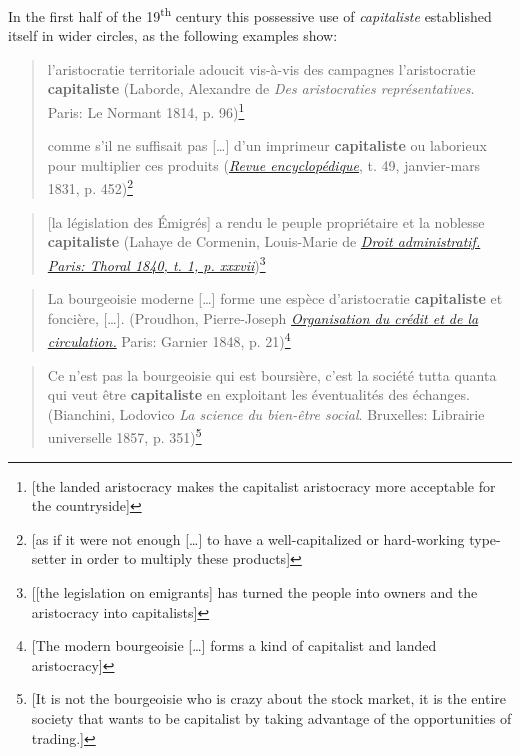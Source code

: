 \documentclass[output=paper]{langsci/langscibook}
\begin{document}
In the first half of the 19\textsuperscript{th} century this possessive
use of \emph{capitaliste} established itself in wider circles, as the
following examples show:

\begin{quote}
l'aristocratie territoriale adoucit vis-à-vis des campagnes
l'aristocratie \textbf{capitaliste} (Laborde, Alexandre de \emph{Des
aristocraties représentatives}. Paris: Le Normant 1814, p. 96)\footnote{{[}the
  landed aristocracy makes the capitalist aristocracy more acceptable
  for the countryside{]}}

comme s'il ne suffisait pas {[}\ldots{}{]} d'un imprimeur
\textbf{capitaliste} ou laborieux pour multiplier ces produits
(\href{https://books.google.at/books?id=Pz9BAAAAcAAJ\&pg=RA1-PA452\&dq=\%
22capitaliste\%22\&hl=de\&sa=X\&ved=0ahUKEwjqzZ6N_5XOAhVCchQKHe7-DsM4MhDoAQgiMAE
}{\emph{Revue
encyclopédique}}, t. 49, janvier-mars 1831, ‎p. 452)\footnote{{[}as if
  it were not enough {[}\ldots{}{]} to have a well-capitalized or
  hard-working type-setter in order to multiply these products{]}}
\end{quote}

\begin{quote}
{[}la législation des Émigrés{]} a rendu le peuple propriétaire et la
noblesse \textbf{capitaliste} (Lahaye de Cormenin, Louis-Marie de
\href{https://books.google.at/books?id=P8tIAAAAcAAJ\&pg=PR37\&dq=\%22capitaliste
\%22\&hl=de\&sa=X\&ved=0ahUKEwiK1NTVgpbOAhUIGhQKHTlEAIc4ggEQ6AEIXzAJ}{\emph{
Droit
administratif. Paris: Thoral 1840, t. 1, p. xxxvii}})\footnote{{[}{[}the
  legislation on emigrants{]} has turned the people into owners and the
  aristocracy into capitalists{]}}
\end{quote}

\begin{quote}
La bourgeoisie moderne {[}\ldots{}{]} forme une espèce d'aristocratie
\textbf{capitaliste} et foncière, {[}\ldots{}{]}. (Proudhon,
Pierre-Joseph
\href{https://books.google.at/books?id=uzk-AAAAcAAJ\&pg=RA2-PA21\&dq=
aristocratie+capitaliste\&hl=de\&sa=X\&ved=
0ahUKEwj_4aPTz5jOAhVIvxQKHbFUAPwQ6AEIPDAE}{\emph{Organisation
du crédit et de la circulation.}} Paris: Garnier 1848, p. 21)\footnote{{[}The
  modern bourgeoisie {[}\ldots{}{]} forms a kind of capitalist and
  landed aristocracy{]}}
\end{quote}

\begin{quote}
Ce n'est pas la bourgeoisie qui est boursière, c'est la société tutta
quanta qui veut être \textbf{capitaliste} en exploitant les éventualités
des échanges. (Bianchini, Lodovico \emph{La science du bien-être
social}. Bruxelles: Librairie universelle 1857, p. 351)\footnote{{[}It is not
the bourgeoisie who is crazy about the stock market, it is the entire society that wants to be capitalist by taking advantage of the opportunities of
trading.{]}}


\end{quote}
\end{document}
